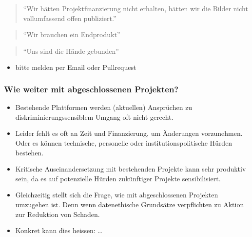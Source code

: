 \documentclass[
  letterpaper,
  DIV=11,
  numbers=noendperiod]{scrartcl}
\providecommand{\tightlist}{%
  \setlength{\itemsep}{0pt}\setlength{\parskip}{0pt}}\usepackage{longtable,booktabs,array}
\begin{document}
\begin{quote}
``Wir hätten Projektfinanzierung nicht erhalten, hätten wir die Bilder
nicht vollumfassend offen publiziert.''
\end{quote}

\begin{quote}
``Wir brauchen ein Endprodukt''
\end{quote}

\begin{quote}
``Uns sind die Hände gebunden''
\end{quote}

\begin{tcolorbox}[enhanced jigsaw, colbacktitle=quarto-callout-note-color!10!white, rightrule=.15mm, coltitle=black, left=2mm, opacitybacktitle=0.6, toptitle=1mm, title=\textcolor{quarto-callout-note-color}{\faInfo}\hspace{0.5em}{Wir sammeln weitere Statements}, colback=white, colframe=quarto-callout-note-color-frame, opacityback=0, titlerule=0mm, leftrule=.75mm, breakable, bottomtitle=1mm, bottomrule=.15mm, arc=.35mm, toprule=.15mm]

\begin{itemize}
\tightlist
\item
  bitte melden per Email oder Pullrequest
\end{itemize}

\end{tcolorbox}

\subsubsection{Wie weiter mit abgeschlossenen
Projekten?}\label{wie-weiter-mit-abgeschlossenen-projekten}

\begin{itemize}
\tightlist
\item
  Bestehende Plattformen werden (aktuellen) Ansprüchen zu
  diskriminierungssensiblem Umgang oft nicht gerecht.
\item
  Leider fehlt es oft an Zeit und Finanzierung, um Änderungen
  vorzunehmen. Oder es können technische, personelle oder
  institutionspolitische Hürden bestehen.
\item
  Kritische Auseinandersetzung mit bestehenden Projekte kann sehr
  produktiv sein, da es auf potenzielle Hürden zukünftiger Projekte
  sensibilisiert.
\item
  Gleichzeitig stellt sich die Frage, wie mit abgeschlossenen Projekten
  umzugehen ist. Denn wenn datenethische Grundsätze verpflichten zu
  Aktion zur Reduktion von Schaden.
\item
  Konkret kann dies heissen: \ldots{}
\end{itemize}
\end{document}
